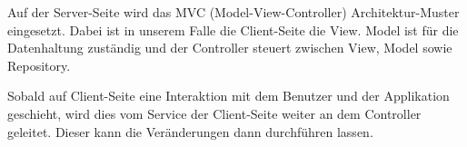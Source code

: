 Auf der Server-Seite wird das MVC (Model-View-Controller) Architektur-Muster eingesetzt. Dabei ist in unserem Falle die Client-Seite die View. Model ist für die Datenhaltung zuständig und der Controller steuert zwischen View, Model sowie Repository.  

Sobald auf Client-Seite eine Interaktion mit dem Benutzer und der Applikation geschieht, wird dies vom Service der Client-Seite weiter an dem Controller geleitet. Dieser kann die Veränderungen dann durchführen lassen.

